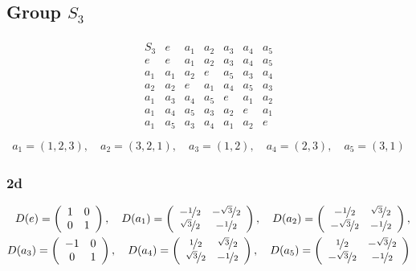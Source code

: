 \documentclass[10pt,a4paper]{article}
\theoremstyle{definition}
\begin{document}
\subsection{Group $S_3$}
\begin{align}
\begin{array}{c||cccccc}
S_3 & e   & a_1 & a_2 & a_3 & a_4 & a_5\\ \hline\hline
e   & e   & a_1 & a_2 & a_3 & a_4 & a_5\\
a_1 & a_1 & a_2 & e   & a_5 & a_3 & a_4 \\
a_2 & a_2 & e   & a_1 & a_4 & a_5 & a_3 \\
a_1 & a_3 & a_4 & a_5 & e   & a_1 & a_2 \\
a_1 & a_4 & a_5 & a_3 & a_2 & e   & a_1 \\
a_1 & a_5 & a_3 & a_4 & a_1 & a_2 & e \\
\end{array}
\end{align}
\begin{align}
a_1=(1,2,3),\quad a_2=(3,2,1),\quad a_3=(1,2),\quad a_4=(2,3),\quad a_5=(3, 1) 
\end{align}

\subsubsection{2d}
\begin{align}
D(e)=\left(\begin{array}{cc}
1 & 0\\
0 & 1
\end{array}
\right),\quad
D(a_1)=\left(\begin{array}{cc}
-\nicefrac{1}{2} & -\nicefrac{\sqrt{3}}{2}\\
 \nicefrac{\sqrt{3}}{2} & -\nicefrac{1}{2}
\end{array}
\right),\quad
D(a_2)=\left(\begin{array}{cc}
-\nicefrac{1}{2} & \nicefrac{\sqrt{3}}{2}\\
-\nicefrac{\sqrt{3}}{2} & -\nicefrac{1}{2}
\end{array}
\right),\\
D(a_3)=\left(\begin{array}{cc}
-1 & 0\\
0 & 1
\end{array}
\right),\quad
D(a_4)=\left(\begin{array}{cc}
\nicefrac{1}{2} & \nicefrac{\sqrt{3}}{2}\\
\nicefrac{\sqrt{3}}{2} & -\nicefrac{1}{2}
\end{array}
\right),\quad
D(a_5)=\left(\begin{array}{cc}
\nicefrac{1}{2} & -\nicefrac{\sqrt{3}}{2}\\
-\nicefrac{\sqrt{3}}{2} & -\nicefrac{1}{2}
\end{array}
\right)
\end{align}
\end{document}
